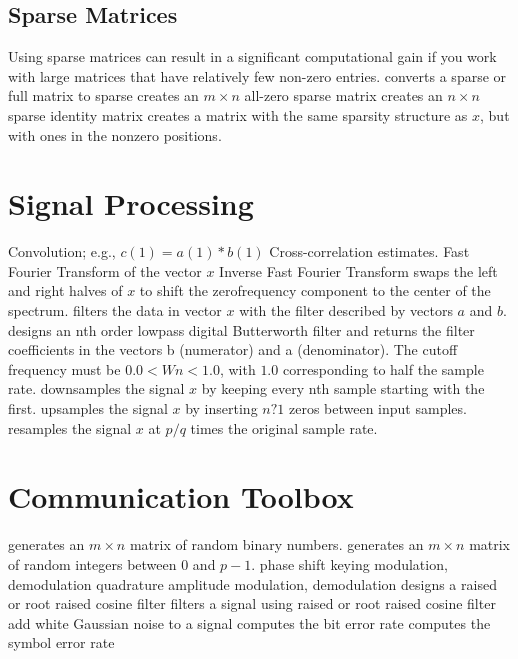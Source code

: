 \subsection{Sparse Matrices}{Using sparse matrices can result in a significant
    computational gain if you work with large matrices that have relatively few
        non-zero entries.}
	{converts a sparse or full matrix to sparse}
	{creates an $m \times n$ all-zero sparse matrix}
	{creates an $n \times n$ sparse identity matrix}
	{creates a matrix with the same sparsity structure as $x$, but with ones in the nonzero positions.}

\section{Signal Processing}{}
	{Convolution; e.g., $c(1)=a(1)*b(1)$}
	{Cross-correlation estimates.}
	{Fast Fourier Transform of the vector $x$}
	{Inverse Fast Fourier Transform}
	{swaps the left and right halves of $x$ to shift the zerofrequency component to the center of the spectrum.}
	{filters the data in vector $x$ with the filter described by vectors $a$ and $b$.}
	{designs an nth order lowpass digital
    Butterworth filter and returns the filter coefficients in the vectors b
        (numerator) and a (denominator). The cutoff frequency must be $0.0 < Wn < 1.0$,
        with $1.0$ corresponding to half the sample rate.}
	{downsamples the signal $x$ by keeping every nth sample starting with the first.}
	{upsamples the signal $x$ by inserting $n?1$ zeros between input samples.}
	{resamples the signal $x$ at $p/q$ times the original sample rate.}

\section{Communication Toolbox}{}
	{generates an $m \times n$ matrix of random binary numbers.}
	{generates an $m \times n$ matrix of random integers between $0$ and $p-1$.}
	{phase shift keying modulation, demodulation}
	{quadrature amplitude modulation, demodulation}
	{designs a raised or root raised cosine filter}
	{filters a signal using raised or root raised cosine filter}
	{add white Gaussian noise to a signal}
	{computes the bit error rate}
	{computes the symbol error rate}

